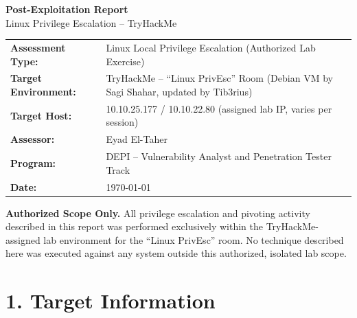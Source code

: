 \documentclass[11pt]{article}
\begin{document}
\begin{titlepage}
  \centering
  \vspace*{1cm}
  {\Huge\bfseries\color{navy} Post-Exploitation Report}\\[0.4cm]
  {\Large\color{teal} Linux Privilege Escalation -- TryHackMe}\\[1.5cm]

  \begin{tcolorbox}[colback=lightgray,colframe=navy,width=0.85\linewidth,arc=2mm,boxrule=1pt]
    \begin{tabular}{L{4cm}L{9cm}}
      \textbf{Assessment Type:} & Linux Local Privilege Escalation (Authorized Lab Exercise) \\[4pt]
      \textbf{Target Environment:} & TryHackMe -- ``Linux PrivEsc'' Room (Debian VM by Sagi Shahar, updated by Tib3rius) \\[4pt]
      \textbf{Target Host:} & 10.10.25.177 / 10.10.22.80 (assigned lab IP, varies per session) \\[4pt]
      \textbf{Assessor:} & Eyad El-Taher \\[4pt]
      \textbf{Program:} & DEPI -- Vulnerability Analyst and Penetration Tester Track \\[4pt]
      \textbf{Date:} & \today \\
    \end{tabular}
  \end{tcolorbox}

  \vfill
  \begin{tcolorbox}[colback=white,colframe=critical,arc=1mm,boxrule=1pt,width=0.85\linewidth]
    \small\textbf{Authorized Scope Only.} All privilege escalation and pivoting activity described
    in this report was performed exclusively within the TryHackMe-assigned lab environment for the
    ``Linux PrivEsc'' room. No technique described here was executed against any system outside
    this authorized, isolated lab scope.
  \end{tcolorbox}
  \vspace{1cm}
\end{titlepage}

\tableofcontents
\newpage

\section{1. Target Information}
\end{document}
